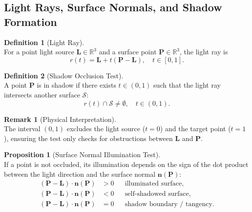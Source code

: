 \documentclass[12pt,a4paper]{article}
\theoremstyle{definition}
\newtheorem{definition}{Definition}[subsection]
\newtheorem{proposition}{Proposition}[subsection]
\newtheorem{remark}{Remark}[subsection]
\newcommand{\R}{\mathbb{R}}
\newcommand{\vect}[1]{\bm{#1}}
\begin{document}
\vspace{-1em}
\subsection{Light Rays, Surface Normals, and Shadow Formation}

\begin{definition}[Light Ray] \label{def:light_ray} ~\\
For a point light source $\vect{L} \in \R^3$ and a surface point $\vect{P} \in \R^3$, the light ray is
\[
\boxed{r(t) = \vect{L} + t(\vect{P} - \vect{L}), \quad t \in [0,1].} \label{eq:light_ray}
\]
\end{definition}

\begin{definition}[Shadow Occlusion Test] \label{def:shadow_occlusion} ~\\
A point $\vect{P}$ is in shadow if there exists $t \in (0,1)$ such that the light ray intersects another surface $\mathcal{S}$:
\[
\boxed{r(t) \cap \mathcal{S} \neq \emptyset, \quad t \in (0,1).}
\]
\end{definition}

\begin{remark}[Physical Interpretation] \label{rmk:occlusion_physics} ~\\
The interval $(0,1)$ excludes the light source ($t=0$) and the target point ($t=1$), ensuring the test only checks for obstructions between $\vect{L}$ and $\vect{P}$.
\end{remark}

\begin{proposition}[Surface Normal Illumination Test] \label{prop: Surface Normal Illumination Test} ~\\
If a point is not occluded, its illumination depends on the sign of the dot product between the light direction and the surface normal $\mathbf{n}(\mathbf{P})$:
\[
\boxed{
\begin{aligned}
(\mathbf{P} - \mathbf{L}) \cdot \mathbf{n}(\mathbf{P}) &> 0 && \text{illuminated surface}, \\[2pt]
(\mathbf{P} - \mathbf{L}) \cdot \mathbf{n}(\mathbf{P}) &< 0 && \text{self-shadowed surface}, \\[2pt]
(\mathbf{P} - \mathbf{L}) \cdot \mathbf{n}(\mathbf{P}) &= 0 && \text{shadow boundary / tangency.}
\end{aligned}
}
\]
\end{proposition}

\newpage
\end{document}
